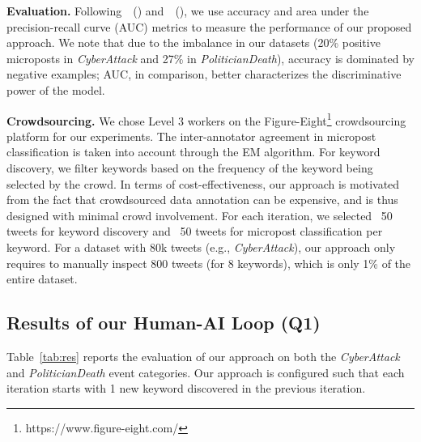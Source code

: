 \documentclass[letterpaper]{article}
\begin{document}
\smallskip
\noindent\textbf{Evaluation.}
Following~\citeauthor{ritter2015weakly}~(\citeyear{ritter2015weakly}) and~\citeauthor{konovalov2017learning}~(\citeyear{konovalov2017learning}), we use accuracy and area under the precision-recall curve (AUC) metrics to measure the performance of our proposed approach. %
We note that due to the imbalance in our datasets (20\% positive microposts in \emph{CyberAttack} and 27\% in \emph{PoliticianDeath}), accuracy is dominated by negative examples; AUC, in comparison, better characterizes the discriminative power of the model.

\smallskip
\noindent\textbf{Crowdsourcing.} We chose Level 3 workers on the Figure-Eight\footnote{https://www.figure-eight.com/} crowdsourcing platform for our experiments. The inter-annotator agreement in micropost classification is taken into account through the EM algorithm. For keyword discovery, we filter keywords based on the frequency of the keyword being selected by the crowd. In terms of cost-effectiveness, our approach is motivated from the fact that crowdsourced data annotation can be expensive, and is thus designed with minimal crowd involvement. For each iteration, we selected ~50 tweets for keyword discovery and ~50 tweets for micropost classification per keyword. For a dataset with 80k tweets (e.g., \emph{CyberAttack}), our approach only requires to manually inspect 800 tweets (for 8 keywords), which is only 1\% of the entire dataset.

\subsection{Results of our Human-AI Loop (Q1)}
Table~\ref{tab:res} reports the evaluation of our approach on both the \emph{CyberAttack} and \emph{PoliticianDeath} event categories. Our approach is configured such that each iteration starts with 1 new keyword discovered in the previous iteration. %

\end{document}
